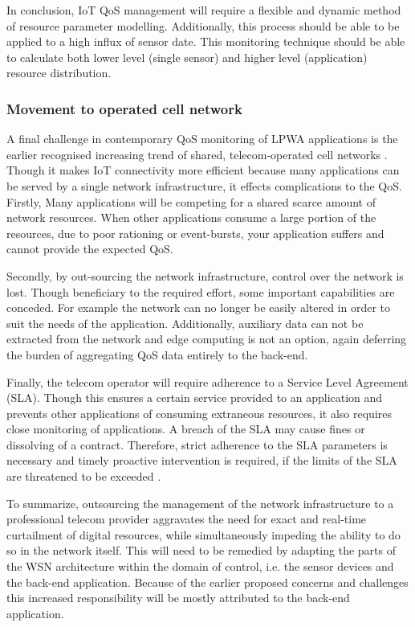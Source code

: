 In conclusion, IoT QoS management will require a flexible and dynamic method of resource parameter modelling. Additionally, this process should be able to be applied to a high influx of sensor date. This monitoring technique should be able to calculate both lower level (single sensor) and higher level (application) resource distribution.

\subsubsection{Movement to operated cell network}
A final challenge in contemporary QoS monitoring of LPWA applications is the earlier recognised increasing trend of shared, telecom-operated cell networks \cite{tmobile, vodafone}. Though it makes IoT connectivity more efficient because many applications can be served by a single network infrastructure, it  effects complications to the QoS. Firstly, Many applications will be competing for a shared scarce amount of network resources. When other applications consume a large portion of the resources, due to poor rationing or event-bursts, your application suffers and cannot provide the expected QoS.

Secondly, by out-sourcing the network infrastructure, control over the network is lost. Though beneficiary to the required effort, some important capabilities are conceded. For example the network can no longer be easily altered in order to suit the needs of the application. Additionally, auxiliary data can not be extracted from the network and edge computing is not an option, again deferring the burden of aggregating QoS data entirely to the back-end.

Finally, the telecom operator will require adherence to a Service Level Agreement (SLA). Though this ensures a certain service provided to an application and prevents other applications of consuming extraneous resources, it also requires close monitoring of applications. A breach of the SLA may cause fines or dissolving of a contract. Therefore, strict adherence to the SLA parameters is necessary and timely proactive intervention is required, if the limits of the SLA are threatened to be exceeded \cite{cloud_computing_monitoring}.

To summarize, outsourcing the management of the network infrastructure to a professional telecom provider aggravates the need for exact and real-time curtailment of digital resources, while simultaneously impeding the ability to do so in the network itself. This will need to be remedied by adapting the parts of the WSN architecture within the domain of control, i.e. the sensor devices and the back-end application. Because of the earlier proposed concerns and challenges this increased responsibility will be mostly attributed to the back-end application.

